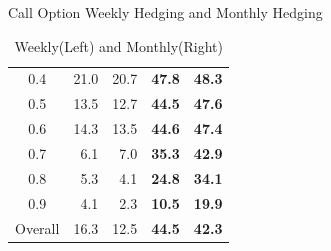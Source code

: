 \documentclass[10pt,table,mathserif]{beamer}
\begin{document}
\begin{frame}[fragile]{Call Option Weekly Hedging and Monthly Hedging}
\begin{table}[htp!]
{\begin{tabular}{|c|r r r r|}
  0.4          &21.0    & 20.7 &\textbf{47.8} &\textbf{48.3}\\
  0.5          &13.5    & 12.7 &\textbf{44.5} &\textbf{47.6}\\
  0.6          &14.3    & 13.5 &\textbf{44.6} &\textbf{47.4}\\
  0.7          &6.1     & 7.0  &\textbf{35.3} &\textbf{42.9}\\
  0.8          &5.3     & 4.1  &\textbf{24.8} &\textbf{34.1}\\
  0.9          &4.1     & 2.3  &\textbf{10.5} &\textbf{19.9}\\
  Overall      &16.3    & 12.5 &\textbf{44.5} &\textbf{42.3} \\
  \hline
\end{tabular}
}\caption{Weekly(Left) and Monthly(Right)}
\end{table}
\end{frame}
\end{document}
